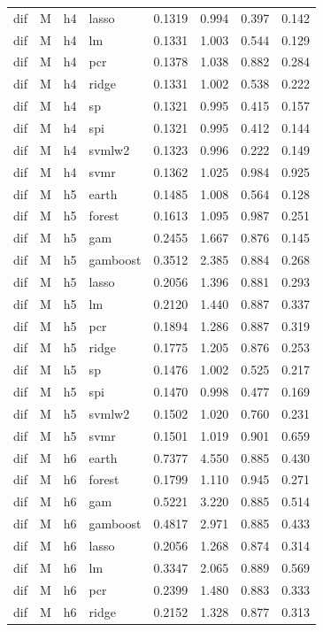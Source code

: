 \begin{ThreePartTable}
\begin{longtable}[t]{llclcccc}
dif & M & h4 & lasso & 0.1319 & 0.994 & 0.397 & 0.142\\
dif & M & h4 & lm & 0.1331 & 1.003 & 0.544 & 0.129\\
dif & M & h4 & pcr & 0.1378 & 1.038 & 0.882 & 0.284\\
dif & M & h4 & ridge & 0.1331 & 1.002 & 0.538 & 0.222\\
dif & M & h4 & sp & 0.1321 & 0.995 & 0.415 & 0.157\\
dif & M & h4 & spi & 0.1321 & 0.995 & 0.412 & 0.144\\
dif & M & h4 & svmlw2 & 0.1323 & 0.996 & 0.222 & 0.149\\
dif & M & h4 & svmr & 0.1362 & 1.025 & 0.984 & 0.925\\
\addlinespace
dif & M & h5 & earth & 0.1485 & 1.008 & 0.564 & 0.128\\
dif & M & h5 & forest & 0.1613 & 1.095 & 0.987 & 0.251\\
dif & M & h5 & gam & 0.2455 & 1.667 & 0.876 & 0.145\\
dif & M & h5 & gamboost & 0.3512 & 2.385 & 0.884 & 0.268\\
dif & M & h5 & lasso & 0.2056 & 1.396 & 0.881 & 0.293\\
dif & M & h5 & lm & 0.2120 & 1.440 & 0.887 & 0.337\\
dif & M & h5 & pcr & 0.1894 & 1.286 & 0.887 & 0.319\\
dif & M & h5 & ridge & 0.1775 & 1.205 & 0.876 & 0.253\\
dif & M & h5 & sp & 0.1476 & 1.002 & 0.525 & 0.217\\
dif & M & h5 & spi & 0.1470 & 0.998 & 0.477 & 0.169\\
dif & M & h5 & svmlw2 & 0.1502 & 1.020 & 0.760 & 0.231\\
dif & M & h5 & svmr & 0.1501 & 1.019 & 0.901 & 0.659\\
\addlinespace
dif & M & h6 & earth & 0.7377 & 4.550 & 0.885 & 0.430\\
dif & M & h6 & forest & 0.1799 & 1.110 & 0.945 & 0.271\\
dif & M & h6 & gam & 0.5221 & 3.220 & 0.885 & 0.514\\
dif & M & h6 & gamboost & 0.4817 & 2.971 & 0.885 & 0.433\\
dif & M & h6 & lasso & 0.2056 & 1.268 & 0.874 & 0.314\\
dif & M & h6 & lm & 0.3347 & 2.065 & 0.889 & 0.569\\
dif & M & h6 & pcr & 0.2399 & 1.480 & 0.883 & 0.333\\
dif & M & h6 & ridge & 0.2152 & 1.328 & 0.877 & 0.313\\

\end{longtable}
\end{ThreePartTable}
